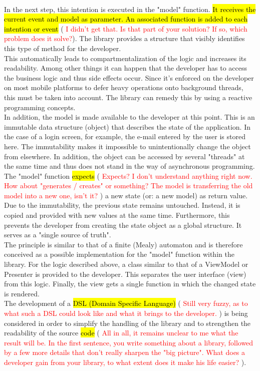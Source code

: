 \\
In the next step, this intention is executed in 
the "model" function. \hl{It receives the current event and model as parameter. An associated function is added to each intention or event} (
\textcolor{red}{I didn't get that. Is that part of your solution? If so, which problem does it solve?}).
The library provides a structure that visibly identifies this type of method for the developer.
\\
This automatically leads to compartmentalization of the logic and increases its readability. Among other things it can happen that the developer has to access the business 
logic
\cite{} 
and thus side effects 
\cite{}
occur. Since it's enforced on the developer on most mobile platforms to defer heavy operations onto background threads, this must be taken
into account. The library can remedy this by using a reactive programming concepts.
\\
In addition, the model is made available to the developer at this point. This is an immutable data structure (object) that describes the state of the application. 
In the case of a login screen, for example, the e-mail entered by the user is stored here. The immutability makes it impossible to unintentionally change the object from elsewhere. 
In addition, the object can be accessed by several "threads" at the same time and thus does not stand in the way of asynchronous programming. The "model" function 
\hl{expects} (
    \textcolor{red}{Expects? I don't understand anything right now. How about "generates / creates" or something? The model is transferring the old model into a new one, isn't it?}
) a new state 
(or: a new model) as return value. Due to the immutability, the previous state remains untouched. Instead, it is copied and provided with new values at the same time. Furthermore, 
this prevents the developer from creating the state object as a global structure. It serves as a "single source of truth".
\\
The principle is similar to that of a finite (Mealy) automaton and is therefore conceived as a possible implementation for the "model" function within the library. 
For the logic described above, a class similar to that of a ViewModel or Presenter is provided to the developer. This separates the user interface (view) from this logic.
Finally, the view gets a single function in which the changed state is rendered.
\\
The development of a 
\hl{DSL (Domain Specific Language)} (
    \textcolor{red}{Still very fuzzy, as to what such a DSL could look like and what it brings to the developer.}
) is being considered in order to simplify the handling of the library and to strengthen the readability 
of the source \hl{code} (
    \textcolor{red}{All in all, it remains unclear to me what the result will be. In the first sentence, you write something about a library, followed by a few more details that don't really sharpen the "big picture". What does a developer gain from your library, to what extent does it make his life easier?}
).


